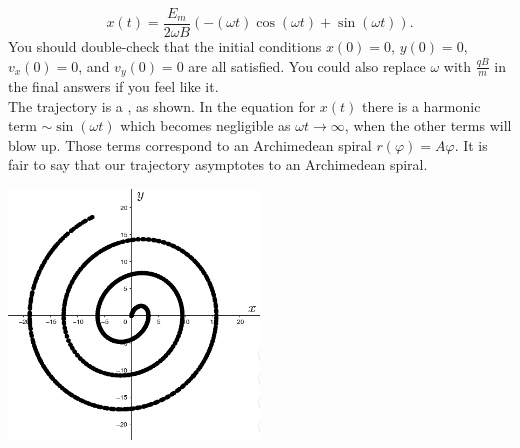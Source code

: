 \documentclass[../TST.tex]{subfiles}
\begin{document}
\begin{solution}
\begin{equation*}
	\boxed{x(t)=\frac{E_m}{2\omega B}\left(-(\omega t)\cos{(\omega t)}+\sin{(\omega t)}\right).}
\end{equation*}
You should double-check that the initial conditions $x(0)=0$, $y(0)=0$, $v_x(0)=0$, and $v_y(0)=0$ are all satisfied. You could also replace $\omega$ with $\frac{qB}{m}$ in the final answers if you feel like it. \\[5pt]
The trajectory is a , as shown. In the equation for $x(t)$ there is a harmonic term $\sim \sin{(\omega t)}$ which becomes negligible as $\omega t \rightarrow \infty$, when the other terms will blow up. Those terms correspond to an Archimedean spiral $r(\varphi)=A\varphi$. It is fair to say that our trajectory asymptotes to an Archimedean spiral.
\begin{center}
\includegraphics[width=0.5\textwidth]{fig/a2012_s3.png}
\end{center}

\end{solution}
\fi
\end{document}
